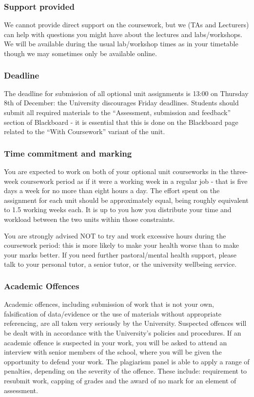 \documentclass[12pt]{article}
\begin{document}
\subsubsection*{Support provided}

 We cannot provide direct support on the coursework, but we (TAs and
 Lecturers) can help with questions you might have about the lectures
 and labs/workshops. We will be available during the usual
 lab/workshop times as in your timetable though we may sometimes only be available online.

 \subsubsection*{Deadline}

The deadline for submission of all optional unit assignments is 13:00
on Thursday 8th of December: the University discourages Friday
deadlines. Students should submit all required materials to the
``Assessment, submission and feedback'' section of Blackboard - it is
essential that this is done on the Blackboard page related to the
``With Coursework'' variant of the unit.

 \subsubsection*{Time commitment and marking}

You are expected to work on both of your optional unit courseworks in
the three-week coursework period as if it were a working week in a regular
job - that is five days a week for no more than eight hours a day. The effort
spent on the assignment for each unit should be approximately equal,
being roughly equivalent to 1.5 working weeks each. It is up to you
how you distribute your time and workload between the two units within
those constraints.

You are strongly advised NOT to try and work excessive hours during
the coursework period: this is more likely to make your health worse
than to make your marks better. If you need further pastoral/mental
health support, please talk to your personal tutor, a senior tutor, or
the university wellbeing service.

 
 \subsubsection*{Academic Offences}

Academic offences, including submission of work that is not your own,
falsification of data/evidence or the use of materials without
appropriate referencing, are all taken very seriously by the
University. Suspected offences will be dealt with in accordance with
the University’s policies and procedures. If an academic offence is
suspected in your work, you will be asked to attend an interview with
senior members of the school, where you will be given the opportunity
to defend your work. The plagiarism panel is able to apply a range of
penalties, depending on the severity of the offence. These include:
requirement to resubmit work, capping of grades and the award of no
mark for an element of assessment.
\end{document}
